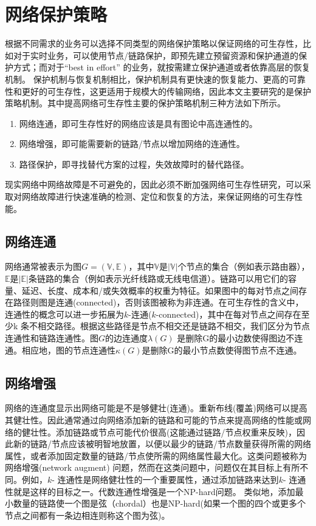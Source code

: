 \section{网络保护策略}
根据不同需求的业务可以选择不同类型的网络保护策略以保证网络的可生存性，比如对于实时业务，可以使用节点/链路保护，即预先建立预留资源和保护通道的保护方式；而对于“best in effort” 的业务，就按需建立保护通道或者依靠高层的恢复机制。 保护机制与恢复机制相比，保护机制具有更快速的恢复能力、更高的可靠性和更好的可生存性，这更适用于规模大的传输网络，因此本文主要研究的是保护策略机制。其中提高网络可生存性主要的保护策略机制三种方法如下所示。
\begin{enumerate}
\item 网络连通，即可生存性好的网络应该是具有图论中高连通性的。
\item 网络增强，即可能需要新的链路/节点以增加网络的连通性。
\item 路径保护，即寻找替代方案的过程，失效故障时的替代路径。
\end{enumerate}


现实网络中网络故障是不可避免的，因此必须不断加强网络可生存性研究，可以采取对网络故障进行快速准确的检测、定位和恢复的方法，来保证网络的可生存性能。
\subsection{网络连通}
网络通常被表示为图$G=(\mathbb{\mathbb{V}},\mathbb{\mathbb{E}})$，其中$\mathbb{\mathbb{V}}$是$|\mathbb{\mathbb{V}}|$个节点的集合（例如表示路由器），$\mathbb{\mathbb{E}}$是$|\mathbb{\mathbb{E}}|$条链路的集合（例如表示光纤线路或无线电信道）。链路可以用它们的容量、延迟、长度、成本和/或失效概率的权重为特征。如果图中的每对节点之间存在路径则图是连通(connected)，否则该图被称为非连通。在可生存性的含义中，连通性的概念可以进一步拓展为$k$-连通($k$-connected)，其中在每对节点之间存在至少k 条不相交路径。根据这些路径是节点不相交还是链路不相交，我们区分为节点连通性和链路连通性。图$G$的边连通度$\lambda(G)$ 是删除G的最小边数使得图边不连通。相应地，图的节点连通性$\kappa(G)$是删除G的最小节点数使得图节点不连通。

\subsection{网络增强}
网络的连通度显示出网络可能是不是够健壮(连通)。重新布线(覆盖)网络可以提高其健壮性\cite{van2010influence}。因此通常通过向网络添加新的链路和可能的节点来提高网络的性能或网络的健壮性。添加链路或节点可能代价很高(这能通过链路/节点权重来反映)，因此新的链路/节点应该被明智地放置，以便以最少的链路/节点数量获得所需的网络属性，或者添加固定数量的链路/节点使所需的网络属性最大化。这类问题被称为网络增强(network augment) 问题，然而在这类问题中，问题仅在其目标上有所不同。例如，$k$- 连通性是网络健壮性的一个重要属性，通过添加链路来达到$k$- 连通性就是这样的目标之一。代数连通性增强是一个NP-hard问题\cite{mosk2008maximum}。 类似地，添加最小数量的链路使一个图是弦（chordal）也是NP-hard\cite{yannakakis1981computing}(如果一个图的四个或更多个节点之间都有一条边相连则称这个图为弦)。

